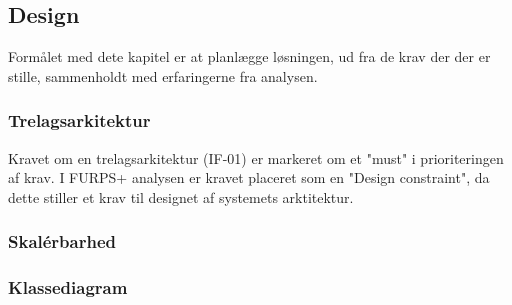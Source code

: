 \subsection{Design}

Formålet med dete kapitel er at planlægge løsningen, ud fra de krav der der er
stille, sammenholdt med erfaringerne fra analysen.


\subsubsection{Trelagsarkitektur}%
\label{ssub:3_lags_arkiteturen}

Kravet om en trelagsarkitektur (IF-01) er markeret om et "must" i prioriteringen af
krav. I FURPS+ analysen er kravet placeret som en "Design constraint", da dette
stiller et krav til designet af systemets arktitektur.


\subsubsection{Skalérbarhed}%
\label{ssub:skalerbarhed}


\subsubsection{Klassediagram}%
\label{ssub:klassediagram}


